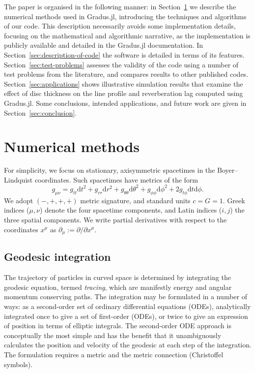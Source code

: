 \documentclass[fleqn,usenatbib]{mnras}
\newcommand{\software}[1]{{\sc #1}}
\newcommand{\Gradus}{\software{Gradus.jl}\xspace}
\renewcommand{\d}{\text{d}}
\begin{document}
The paper is organised in the following manner: in
Section~\ref{sec:numerical-methods} we describe the numerical methods used in
\Gradus, introducing the techniques and algorithms of our code. This description
necessarily avoids some implementation details, focusing on the mathematical and
algorithmic narrative, as the implementation is publicly available and detailed
in the \Gradus documentation. In Section~\ref{sec:description-of-code} the
software is detailed in terms of its features. Section~\ref{sec:test-problems}
assesses the validity of the code using a number of test problems from the
literature, and compares results to other published codes.
Section~\ref{sec:applications} shows illustrative simulation results that
examine the effect of disc thickness on the line profile and reverberation lag
computed using \Gradus. Some conclusions, intended applications, and future work
are given in Section~\ref{sec:conclusion}.

\section{Numerical methods}
\label{sec:numerical-methods}

For simplicity, we focus on stationary, axisymmetric spacetimes in the
Boyer--Lindquist coordinates. Such spacetimes have metrics of the form
\begin{equation}
\label{eq:stationary_axisymmetric_metric}
    g_{\mu\nu}
    = g_{tt} \d t^2
    + g_{rr} \d r^2
    + g_{\theta\theta} \d \theta^2
    + g_{\phi\phi} \d \phi^2
    + 2g_{t\phi} \d t \d \phi.
\end{equation}
We adopt $(-, +, +, +)$ metric signature, and standard units $c = G
= 1$. Greek indices ($\mu, \nu$) denote the four spacetime components, and Latin
indices ($i, j$) the three spatial components. We write partial derivatives with
respect to the coordinates $x^\mu$ as $\partial_\mu := \partial / \partial
x^\mu$.

\subsection{Geodesic integration}

The trajectory of particles in curved space is determined by integrating the
geodesic equation, termed \emph{tracing}, which are manifestly energy and
angular momentum conserving paths. The integration may be formulated in a number
of ways: as a second-order set of ordinary differential equations (ODEs),
analytically integrated once to give a set of first-order (ODEs), or twice to
give an expression of position in terms of elliptic integrals. The second-order
ODE approach is conceptually the most simple and has the benefit that it
unambiguously calculates the position and velocity of the geodesic at each step
of the integration. The formulation requires a metric and
the metric connection (Christoffel symbols).
\end{document}

